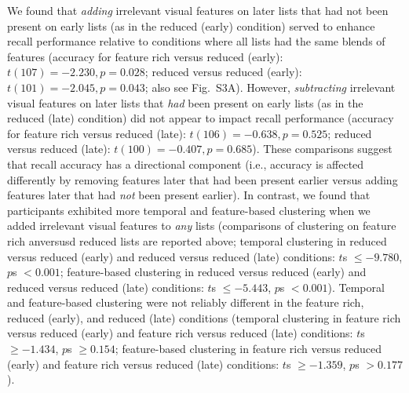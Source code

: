 \documentclass[11pt]{article}
\newcommand{\accuracyByList}{S3}
\begin{document}
We found that \textit{adding} irrelevant visual features on later lists that
had not been present on early lists (as in the reduced (early) condition)
served to enhance recall performance relative to conditions where all lists had
the same blends of features (accuracy for feature rich versus reduced (early):
$t(107) = -2.230, p = 0.028$; reduced versus reduced (early): $t(101) = -2.045,
p = 0.043$; also see Fig.~\accuracyByList A). However, \textit{subtracting}
irrelevant visual features on later lists that \textit{had} been present on
early lists (as in the reduced (late) condition) did not appear to impact
recall performance (accuracy for feature rich versus reduced (late): $t(106) =
-0.638, p = 0.525$; reduced versus reduced (late): $t(100) = -0.407, p =
0.685$). These comparisons suggest that recall accuracy has a directional
component (i.e., accuracy is affected differently by removing features later
that had been present earlier versus adding features later that had
\textit{not} been present earlier). In contrast, we found that participants
exhibited more temporal and feature-based clustering when we added irrelevant
visual features to \textit{any} lists (comparisons of clustering on feature
rich anversusd reduced lists are reported above; temporal clustering in reduced
versus reduced (early) and reduced versus reduced (late) conditions: $t$s $\leq
-9.780$, $p$s $< 0.001$; feature-based clustering in reduced versus reduced
(early) and reduced versus reduced (late) conditions: $t$s $\leq -5.443$, $p$s
$< 0.001$). Temporal and feature-based clustering were not reliably different
in the feature rich, reduced (early), and reduced (late) conditions (temporal
clustering in feature rich versus reduced (early) and feature rich versus
reduced (late) conditions: $t$s $\geq -1.434$, $p$s $\geq 0.154$; feature-based
clustering in feature rich versus reduced (early) and feature rich versus
reduced (late) conditions: $t$s $\geq -1.359$, $p$s $> 0.177$).
\end{document}
